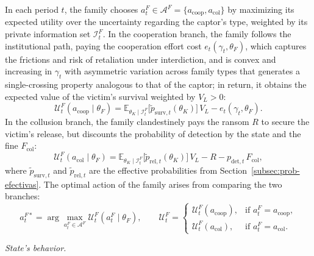 \documentclass[review,authoryear,12pt]{elsarticle}
\theoremstyle{plain}
\theoremstyle{definition}
\newcommand{\E}{\mathbb{E}}
\newcommand{\1}{\mathbf{1}}
\begin{document}
\noindent In each period $t$, the family chooses $a_t^F\in\mathcal{A}^F=\{a_{\mathrm{coop}},a_{\mathrm{col}}\}$ by maximizing its expected utility over the uncertainty regarding the captor's type, weighted by its private information set $\mathcal{I}_t^F$. In the cooperation branch, the family follows the institutional path, paying the cooperation effort cost $e_t(\gamma_t,\theta_F)$, which captures the frictions and risk of retaliation under interdiction, and is convex and increasing in $\gamma_t$ with asymmetric variation across family types that generates a single-crossing property analogous to that of the captor; in return, it obtains the expected value of the victim's survival weighted by $V_L>0$:
\begin{equation}
\mathcal{U}^F_t(a_{\mathrm{coop}}\mid\theta_F)=\E_{\theta_K\mid\mathcal{I}_t^F}\!\bigl[\tilde{p}_{\mathrm{surv},t}(\theta_K)\bigr]\,V_L-e_t(\gamma_t,\theta_F).
\label{eq:f-coop}
\end{equation}
In the collusion branch, the family clandestinely pays the ransom $R$ to secure the victim's release, but discounts the probability of detection by the state and the fine $F_{\mathrm{col}}$:
\begin{equation}
\mathcal{U}^F_t(a_{\mathrm{col}}\mid\theta_F)=\E_{\theta_K\mid\mathcal{I}_t^F}\!\bigl[\tilde{p}_{\mathrm{rel},t}(\theta_K)\bigr]\,V_L-R-p_{\mathrm{det},t}\,F_{\mathrm{col}},
\label{eq:f-col}
\end{equation}
where $\tilde{p}_{\mathrm{surv},t}$ and $\tilde{p}_{\mathrm{rel},t}$ are the effective probabilities from Section~\ref{subsec:prob-efectivas}. The optimal action of the family arises from comparing the two branches:
\begin{equation}
a_t^{F\ast}=\arg\max_{a_t^F\in\mathcal{A}^F}\mathcal{U}^F_t(a_t^F\mid\theta_F),\qquad
\mathcal{U}^F_t=\begin{cases}\mathcal{U}^F_t(a_{\mathrm{coop}}), & \text{if }a_t^F=a_{\mathrm{coop}},\\\mathcal{U}^F_t(a_{\mathrm{col}}), & \text{if }a_t^F=a_{\mathrm{col}}.\end{cases}
\label{eq:f-argmax}
\end{equation}

\noindent\textit{State's behavior.}
\end{document}
